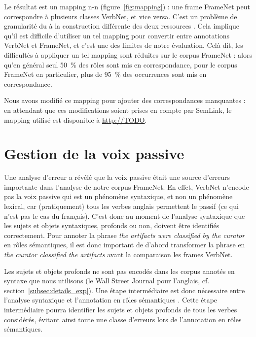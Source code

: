 Le résultat est un mapping n-n (figure~\ref{fig:mapping}) : une frame FrameNet
peut correspondre à plusieurs classes VerbNet, et vice versa. C'est un problème
de granularité du à la construction différente des deux ressources
\citep{palmer2009semlink}. Cela implique qu'il est difficile d'utiliser un tel
mapping pour convertir entre annotations VerbNet et FrameNet, et c'est une des
limites de notre évaluation.  Celà dit, les difficultés à appliquer un tel
mapping sont réduites sur le corpus FrameNet : alors qu'en général seul 50~\%
des rôles sont mis en correspondance, pour le corpus FrameNet en particulier,
plus de 95~\% des occurrences sont mis en correspondance.

Nous avons modifié ce mapping pour ajouter des correspondances manquantes : en
attendant que ces modifications soient prises en compte par SemLink, le mapping
utilisé est disponible à \url{http://TODO}. %

\section{Gestion de la voix passive}
\label{sec:passif}

Une analyse d'erreur a révélé que la voix passive était une source d'erreurs
importante dans l'analyse de notre corpus FrameNet. En effet, VerbNet n'encode
pas la voix passive qui est un phénomène syntaxique, et non un phénomène
lexical, car (pratiquement) tous les verbes anglais permettent le passif (ce
qui n'est pas le cas du français). C'est donc au moment de l'analyse syntaxique
que les sujets et objets syntaxiques, profonds ou non, doivent être identifiés
correctement. Pour annoter la phrase \emph{the artifacts were classified by the
curator} en rôles sémantiques, il est donc important de d'abord transformer la
phrase en \emph{the curator classified the artifacts} avant la comparaison les
frames VerbNet.

Les sujets et objets profonds ne sont pas encodés dans les corpus annotés en
syntaxe que nous utilisons (le Wall Street Journal pour l'anglais, cf.
section~\ref{subsec:details_exp}). Une étape intermédiaire est donc nécessaire
entre l'analyse syntaxique et l'annotation en rôles sémantiques
\citep{bonfante2011modular, ribeyre2013systeme}. Cette étape intermédiaire
pourra identifier les sujets et objets profonds de tous les verbes considérés,
évitant ainsi toute une classe d'erreurs lors de l'annotation en rôles
sémantiques. 

